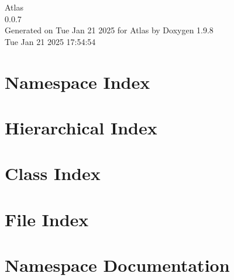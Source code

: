 \documentclass[twoside]{book}
\newcommand{\+}{\discretionary{\mbox{\scriptsize$\hookleftarrow$}}{}{}}
\newcommand{\clearemptydoublepage}{%
    \newpage{\pagestyle{empty}\cleardoublepage}%
  }
\begin{document}
  \raggedbottom
    \hypersetup{pageanchor=false,
                bookmarksnumbered=true,
                pdfencoding=unicode
               }
  \begin{titlepage}
  \vspace*{7cm}
  \begin{center}%
  {\Large Atlas}\\
  [1ex]\large 0.\+0.\+7 \\
  \vspace*{1cm}
  {\large Generated on Tue Jan 21 2025 for Atlas by Doxygen 1.9.8}\\
    \vspace*{0.5cm}
    {\small Tue Jan 21 2025 17:54:54}
  \end{center}
  \end{titlepage}
  \clearemptydoublepage
  \tableofcontents
  \clearemptydoublepage
  \hypersetup{pageanchor=true}




\chapter{Namespace Index}

\chapter{Hierarchical Index}

\chapter{Class Index}

\chapter{File Index}

\chapter{Namespace Documentation}













\end{document}
